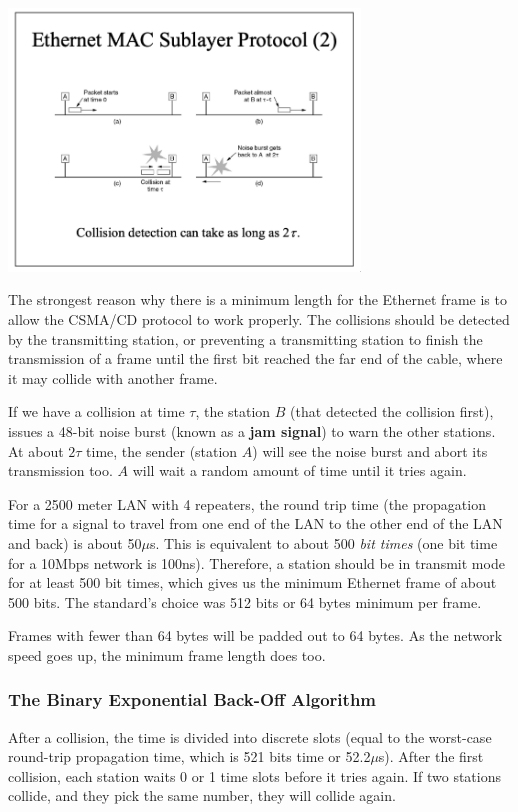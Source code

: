 \documentclass[11pt]{article}
\begin{document}
\begin{center}
    \includegraphics[width=0.7\textwidth]{ethernetmacsublayerprotocol2.png}
\end{center}

The strongest reason why there is a minimum length for the Ethernet frame is to allow the CSMA/CD protocol to 
work properly. 
The collisions should be detected by the transmitting station, or preventing a transmitting station to finish the 
transmission of a frame until the first bit reached the far end of the cable, where it may collide with another 
frame.

If we have a collision at time $\tau$, the station $B$ (that detected the collision first), issues a 48-bit noise burst 
(known as a \textbf{jam signal}) to warn the other stations.
At about $2\tau$ time, the sender (station $A$) will see the noise burst and abort its transmission too. 
$A$ will wait a random amount of time until it tries again.

For a 2500 meter LAN with 4 repeaters, the round trip time (the propagation time for a signal to travel from one 
end of the LAN to the other end of the LAN and back) is about 50$\mu$s. 
This is equivalent to about 500 \textit{bit times} (one bit time for a 10Mbps network is 100ns).
Therefore, a station should be in transmit mode for at least 500 bit times, which gives us the minimum Ethernet 
frame of about 500 bits. 
The standard's choice was 512 bits or 64 bytes minimum per frame.

Frames with fewer than 64 bytes will be padded out to 64 bytes.
As the network speed goes up, the minimum frame length does too.

\subsubsection{The Binary Exponential Back-Off Algorithm}
After a collision, the time is divided into discrete slots (equal to the worst-case round-trip propagation time, 
which is 521 bits time or 52.2$\mu$s).
After the first collision, each station waits 0 or 1 time slots before it tries again. 
If two stations collide, and they pick the same number, they will collide again.
\end{document}
